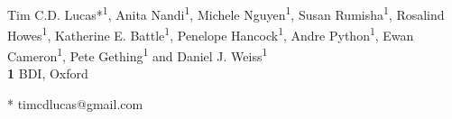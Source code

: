 \documentclass[10pt,letterpaper]{article}
\begin{document}
\vspace*{0.2in}

\begin{flushleft}
{\Large
\textbf{} %
}
\newline
\\
Tim C.D. Lucas*\textsuperscript{1}, Anita Nandi\textsuperscript{1}, Michele Nguyen\textsuperscript{1}, Susan Rumisha\textsuperscript{1}, Rosalind Howes\textsuperscript{1}, Katherine E. Battle\textsuperscript{1}, Penelope Hancock\textsuperscript{1}, Andre Python\textsuperscript{1}, Ewan Cameron\textsuperscript{1}, Pete Gething\textsuperscript{1} and Daniel J. Weiss\textsuperscript{1}
\\
\bigskip
\textbf{1} BDI, Oxford
\\
\bigskip

% 
%




* timcdlucas@gmail.com

\end{flushleft}
\end{document}
